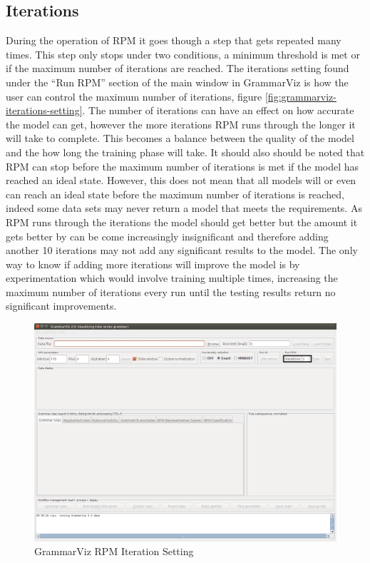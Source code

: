 \documentclass[letterpaper, 12pt]{article}
\begin{document}
\newpage
\subsection{Iterations}
During the operation of RPM it goes though a step that gets repeated many times. This step only stops under two conditions, a minimum threshold is met or if the maximum number of iterations are reached. The iterations setting found under the ``Run RPM'' section of the main window in GrammarViz is how the user can control the maximum number of iterations, figure \ref{fig:grammarviz-iterations-setting}. The number of iterations can have an effect on how accurate the model can get, however the more iterations RPM runs through the longer it will take to complete. This becomes a balance between the quality of the model and the how long the training phase will take. It should also should be noted that RPM can stop before the maximum number of iterations is met if the model has reached an ideal state. However, this does not mean that all models will or even can reach an ideal state before the maximum number of iterations is reached, indeed some data sets may never return a model that meets the requirements. As RPM runs through the iterations the model should get better but the amount it gets better by can be come increasingly insignificant and therefore adding another 10 iterations may not add any significant results to the model. The only way to know if adding more iterations will improve the model is by experimentation which would involve training multiple times, increasing the maximum number of iterations every run until the testing results return no significant improvements.

\begin{figure}[H]
  \includegraphics[width=\textwidth]{grammarviz-iterations-setting}
  \caption{GrammarViz RPM Iteration Setting}
  \label{fig:grammarviz-iteration-setting}
\end{figure}
\end{document}
